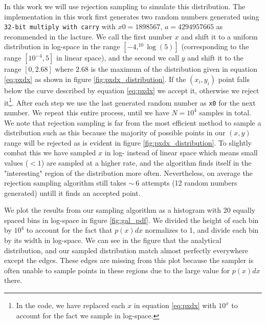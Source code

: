 In this work we will use rejection sampling to simulate this distribution. The implementation in this work first generates two random numbers generated using \texttt{32-bit multiply with carry} with $x0=1898567$, $a=4294957665$ as recommended in the lacture. We call the first number $x$ and shift it to a uniform distribution in log-space in the range $\left[-4, ^{10}\log(5)\right]$ (corresponding to the range $\left[10^{-4}, 5\right]$ in linear space), and the second we call $y$ and shift it to the range $\left[0, 2.68\right]$ where $2.68$ is the maximum of the distribution given in equation \ref{eq:pxdx} as shown in figure \ref{fig:pxdx_distribution}. If the $\left(x_i, y_i\right)$ point falls below the curve described by equation \ref{eq:pxdx} we accept it, otherwise we reject it\footnote{In the code, we have replaced each $x$ in equation \ref{eq:pxdx} with $10^x$ to account for the fact we sample in log-space.}. After each step we use the last generated random number as \texttt{x0} for the next number. We repeat this entire process, until we have $N = 10^4$ samples in total. We note that rejection sampling is far from the most efficient method to sample a distribution such as this because the majority of possible points in our $\left(x, y\right)$ range will be rejected as is evident in figure \ref{fig:pxdx_distribution}. To slightly combat this we have sampled $x$ in log- instead of linear space which means small values ($<1$) are sampled at a higher rate, and the algorithm finds itself in the "interesting" region of the distribution more often. Nevertheless, on average the rejection sampling algorithm still takes $\sim~6$ attempts (12 random numbers generated) untill it finds an accepted point.

We plot the results from our sampling algorithm as a histogram with 20 equally spaced bins in log-space in figure \ref{fig:gal_pdf}. We divided the height of each bin by $10^4$ to account for the fact that $p(x)dx$ normalizes to 1, and divide each bin by its width in log-space. We can see in the figure that the analytical distribution, and our sampled distribution match almost perfectly everywhere except the edges. These edges are missing from this plot because the sampler is often unable to sample points in these regions due to the large value for $p(x)dx$ there.

